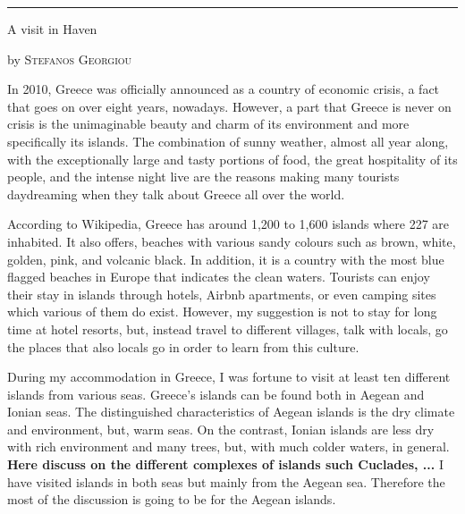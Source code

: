 \documentclass[10pt,a4paper]{article} %
\newcommand{\SepRule}{\noindent	%
\begin{center}
\rule{250pt}{1pt} %
\end{center}
}
\newcommand{\NewsItem}[1]{ %
\usefont{T1}{fvs}{n}{n} %
\vspace{24pt}\large #1\vspace{3pt} %
\par \normalsize \normalfont}
\newcommand{\NewsAuthor}[1]{ %
\hfill by \textsc{#1} \vspace{20pt} %
\par \normalfont}
\begin{document}
\vspace{0.5cm}
\SepRule %
\vspace{0.5cm}

\begin{multicols}{3} %


\NewsItem{A visit in Haven}
\NewsAuthor{Stefanos Georgiou}

In 2010, Greece was officially announced as a country of economic crisis, 
a fact that goes on over eight years, nowadays. 
However, a part that Greece is never on crisis is the unimaginable beauty and charm 
of its environment and more specifically its islands. 
The combination of sunny weather, almost all year along, with the exceptionally 
large and tasty portions of food, the great hospitality of its people, and the 
intense night live are the reasons making many tourists daydreaming when they talk 
about Greece all over the world.  


According to Wikipedia, Greece has around 1,200 to 1,600 islands where 227 
are inhabited. 
It also offers, beaches with various sandy colours such as brown, white, golden, 
pink, and volcanic black. 
In addition, it is a country with the most blue flagged beaches in Europe that 
indicates the clean waters. 
Tourists can enjoy their stay in islands through hotels, Airbnb apartments, 
or even camping sites which various of them do exist. 
However, my suggestion is not to stay for long time at hotel resorts, but, instead 
travel to different villages, talk with locals, go the places that also locals 
go in order to learn from this culture.  


During my accommodation in Greece, I was fortune to visit at least ten different 
islands from various seas. 
Greece's islands can be found both in Aegean and Ionian seas. 
The distinguished characteristics of Aegean islands is the dry climate and 
environment, but, warm seas. 
On the contrast, Ionian islands are less dry with rich environment and many 
trees, but, with much colder waters, in general. 
\textbf{Here discuss on the different complexes of islands such Cuclades, ...}
I have visited islands in both seas but mainly from the Aegean sea. 
Therefore the most of the discussion is going to be for the Aegean islands. 



\end{multicols}
\end{document}

